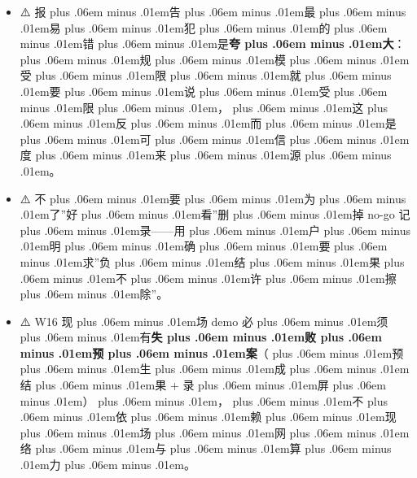 \documentclass[
]{article}
\providecommand{\tightlist}{%
  \setlength{\itemsep}{0pt}\setlength{\parskip}{0pt}}
\def\zh#1{{\zhfont #1}}
\def\sym#1{{\symfont #1}}
\def\zhglue{\hskip0pt plus .06em minus .01em}
\begin{document}
\begin{itemize}
\tightlist
\item
  \sym{⚠️} \zh{报\zhglue 告\zhglue 最\zhglue 易\zhglue 犯\zhglue 的\zhglue 错\zhglue 是}\textbf{\zh{夸\zhglue 大}}\zh{：\zhglue 规\zhglue 模\zhglue 受\zhglue 限\zhglue 就\zhglue 要\zhglue 说\zhglue 受\zhglue 限\zhglue ，\zhglue 这\zhglue 反\zhglue 而\zhglue 是\zhglue 可\zhglue 信\zhglue 度\zhglue 来\zhglue 源\zhglue 。}
\item
  \sym{⚠️} \zh{不\zhglue 要\zhglue 为\zhglue 了}''\zh{好\zhglue 看}''\zh{删\zhglue 掉} no-go \zh{记\zhglue 录}------\zh{用\zhglue 户\zhglue 明\zhglue 确\zhglue 要\zhglue 求}''\zh{负\zhglue 结\zhglue 果\zhglue 不\zhglue 许\zhglue 擦\zhglue 除}''\zh{。}
\item
  \sym{⚠️} W16 \zh{现\zhglue 场} demo \zh{必\zhglue 须\zhglue 有}\textbf{\zh{失\zhglue 败\zhglue 预\zhglue 案}}\zh{（\zhglue 预\zhglue 生\zhglue 成\zhglue 结\zhglue 果} + \zh{录\zhglue 屏\zhglue ）\zhglue ，\zhglue 不\zhglue 依\zhglue 赖\zhglue 现\zhglue 场\zhglue 网\zhglue 络\zhglue 与\zhglue 算\zhglue 力\zhglue 。}
\end{itemize}
\end{document}
